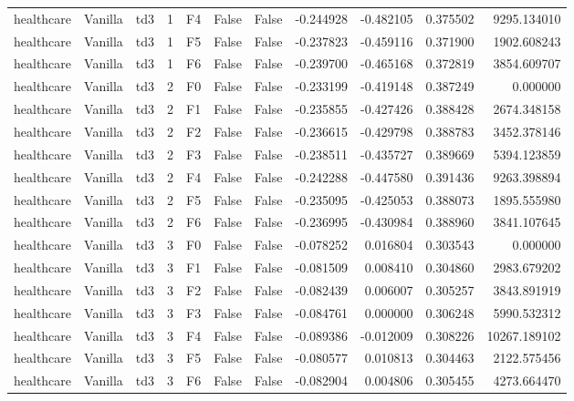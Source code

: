 \begin{tabular}{lllrlllrrrr}
healthcare & Vanilla &       td3 &     1 &  F4 &           False &            False & -0.244928 & -0.482105 & 0.375502 &      9295.134010 \\
healthcare & Vanilla &       td3 &     1 &  F5 &           False &            False & -0.237823 & -0.459116 & 0.371900 &      1902.608243 \\
healthcare & Vanilla &       td3 &     1 &  F6 &           False &            False & -0.239700 & -0.465168 & 0.372819 &      3854.609707 \\
healthcare & Vanilla &       td3 &     2 &  F0 &           False &            False & -0.233199 & -0.419148 & 0.387249 &         0.000000 \\
healthcare & Vanilla &       td3 &     2 &  F1 &           False &            False & -0.235855 & -0.427426 & 0.388428 &      2674.348158 \\
healthcare & Vanilla &       td3 &     2 &  F2 &           False &            False & -0.236615 & -0.429798 & 0.388783 &      3452.378146 \\
healthcare & Vanilla &       td3 &     2 &  F3 &           False &            False & -0.238511 & -0.435727 & 0.389669 &      5394.123859 \\
healthcare & Vanilla &       td3 &     2 &  F4 &           False &            False & -0.242288 & -0.447580 & 0.391436 &      9263.398894 \\
healthcare & Vanilla &       td3 &     2 &  F5 &           False &            False & -0.235095 & -0.425053 & 0.388073 &      1895.555980 \\
healthcare & Vanilla &       td3 &     2 &  F6 &           False &            False & -0.236995 & -0.430984 & 0.388960 &      3841.107645 \\
healthcare & Vanilla &       td3 &     3 &  F0 &           False &            False & -0.078252 &  0.016804 & 0.303543 &         0.000000 \\
healthcare & Vanilla &       td3 &     3 &  F1 &           False &            False & -0.081509 &  0.008410 & 0.304860 &      2983.679202 \\
healthcare & Vanilla &       td3 &     3 &  F2 &           False &            False & -0.082439 &  0.006007 & 0.305257 &      3843.891919 \\
healthcare & Vanilla &       td3 &     3 &  F3 &           False &            False & -0.084761 &  0.000000 & 0.306248 &      5990.532312 \\
healthcare & Vanilla &       td3 &     3 &  F4 &           False &            False & -0.089386 & -0.012009 & 0.308226 &     10267.189102 \\
healthcare & Vanilla &       td3 &     3 &  F5 &           False &            False & -0.080577 &  0.010813 & 0.304463 &      2122.575456 \\
healthcare & Vanilla &       td3 &     3 &  F6 &           False &            False & -0.082904 &  0.004806 & 0.305455 &      4273.664470 \\
\bottomrule
\end{tabular}
